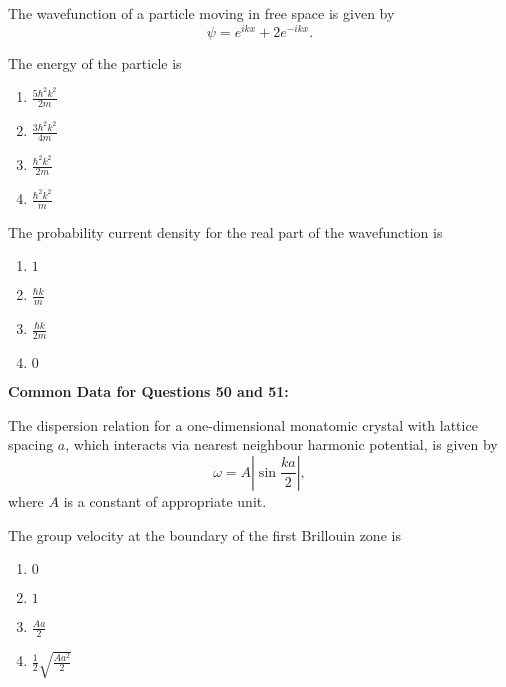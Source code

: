     The wavefunction of a particle moving in free space is given by
    \begin{equation*}
    \psi = e^{ikx} + 2e^{-ikx}.
    \end{equation*}


        \item The energy of the particle is
        \begin{enumerate}
            \item $\frac{5\hbar^2 k^2}{2m}$\\
            \item $\frac{3\hbar^2 k^2}{4m}$\\
            \item $\frac{\hbar^2 k^2}{2m}$\\
            \item $\frac{\hbar^2 k^2}{m}$
        \end{enumerate}

        \item The probability current density for the real part of the wavefunction is
        \begin{enumerate}
            \item $1$
            \item $\frac{\hbar k}{m}$
            \item $\frac{\hbar k}{2m}$
            \item $0$
        \end{enumerate}

\textbf{Common Data for Questions 50 and 51:}

The dispersion relation for a one-dimensional monatomic crystal with lattice spacing $a$, which interacts via nearest neighbour harmonic potential, is given by
    \begin{equation*}
    \omega = A \left| \sin \frac{ka}{2} \right|,
    \end{equation*}
where $A$ is a constant of appropriate unit.

    
        \item The group velocity at the boundary of the first Brillouin zone is
        \begin{enumerate}
            \item $0$
            \item $1$
            \item $\frac{Aa}{2}$
            \item $\frac{1}{2} \sqrt{\frac{Aa^2}{2}}$
        \end{enumerate}

